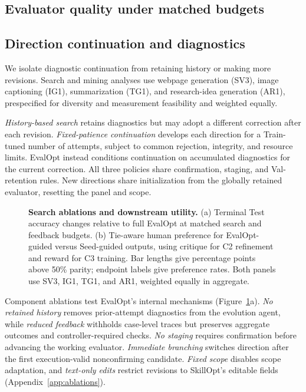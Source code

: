 \subsection{Evaluator quality under matched budgets}
\label{sec:core}
\label{sec:results}


\subsection{Direction continuation and diagnostics}
\label{sec:ablations}
\label{sec:analysis}

We isolate diagnostic continuation from retaining history or making more revisions.
Search and mining analyses use webpage generation (SV3), image captioning (IG1), summarization (TG1), and research-idea generation (AR1), prespecified for diversity and measurement feasibility and weighted equally.

\emph{History-based search} retains diagnostics but may adopt a different correction after each revision.
\emph{Fixed-patience continuation} develops each direction for a Train-tuned number of attempts, subject to common rejection, integrity, and resource limits.
EvalOpt instead conditions continuation on accumulated diagnostics for the current correction.
All three policies share confirmation, staging, and Val-retention rules.
New directions share initialization from the globally retained evaluator, resetting the panel and scope.

\begin{figure}[!t]
\centering

\caption{\textbf{Search ablations and downstream utility.}
(a) Terminal Test accuracy changes relative to full EvalOpt at matched search and feedback budgets.
(b) Tie-aware human preference for EvalOpt-guided versus Seed-guided outputs, using critique for C2 refinement and reward for C3 training. Bar lengths give percentage points above 50\% parity; endpoint labels give preference rates.
Both panels use SV3, IG1, TG1, and AR1, weighted equally in aggregate.}
\label{fig:budget-tests}
\end{figure}

Component ablations test EvalOpt's internal mechanisms (Figure~\ref{fig:budget-tests}a).
\emph{No retained history} removes prior-attempt diagnostics from the evolution agent, while \emph{reduced feedback} withholds case-level traces but preserves aggregate outcomes and controller-required checks.
\emph{No staging} requires confirmation before advancing the working evaluator.
\emph{Immediate branching} switches direction after the first execution-valid nonconfirming candidate.
\emph{Fixed scope} disables scope adaptation, and \emph{text-only edits} restrict revisions to SkillOpt's editable fields (Appendix~\ref{app:ablations}).

